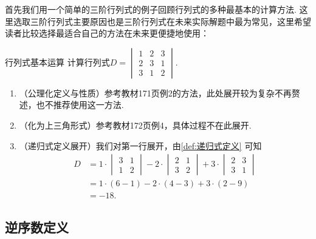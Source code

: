 首先我们用一个简单的三阶行列式的例子回顾行列式的多种最基本的计算方法. 这里选取三阶行列式主要原因也是三阶行列式在未来实际解题中最为常见，这里希望读者比较选择最适合自己的方法在未来更便捷地使用：
\begin{example}{}{行列式基本运算}
    计算行列式$D=\begin{vmatrix}
            1 & 2 & 3 \\
            2 & 3 & 1 \\
            3 & 1 & 2
        \end{vmatrix}$.
\end{example}

\begin{solution}
    \begin{enumerate}
        \item （公理化定义与性质）参考教材171页例2的方法，此处展开较为复杂不再赘述，也不推荐使用这一方法.

        \item （化为上三角形式）参考教材172页例4，具体过程不在此展开.

        \item （递归式定义展开）我们对第一行展开，由\autoref{def:递归式定义} 可知
              \begin{align*}
                  D & =1 \cdot
                  \begin{vmatrix}
                      3 & 1 \\
                      1 & 2
                  \end{vmatrix} - 2
                  \cdot \begin{vmatrix}
                            2 & 1 \\
                            3 & 2
                        \end{vmatrix}+3
                  \cdot \begin{vmatrix}
                            2 & 3 \\
                            3 & 1
                        \end{vmatrix}                           \\
                    & =1 \cdot (6-1)-2 \cdot (4-3)+3 \cdot (2-9) \\
                    & =-18.
              \end{align*}
    \end{enumerate}
\end{solution}

\subsection{逆序数定义}

